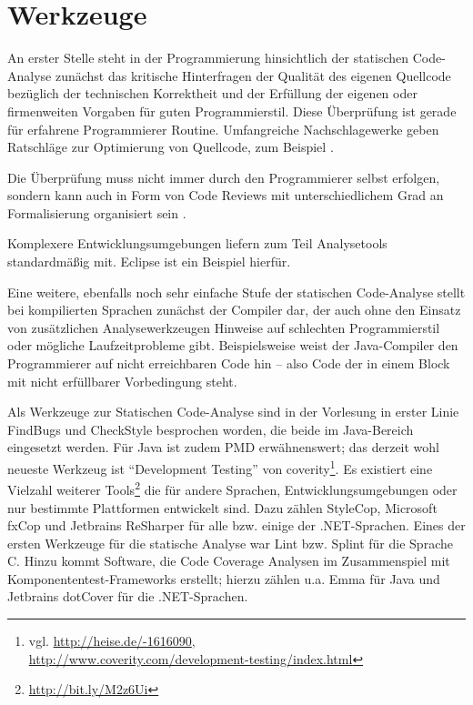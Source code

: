 \section{Werkzeuge}

An erster Stelle steht in der Programmierung hinsichtlich der statischen Code-Analyse zunächst das kritische Hinterfragen der Qualität des eigenen Quellcode bezüglich der technischen Korrektheit und der  Erfüllung der eigenen oder firmenweiten Vorgaben für guten Programmierstil. Diese Überprüfung ist gerade für erfahrene Programmierer Routine. Umfangreiche Nachschlagewerke geben Ratschläge zur Optimierung von Quellcode, zum Beispiel \cite{mcconnell2004}.

Die Überprüfung muss nicht immer durch den Programmierer selbst erfolgen, sondern kann auch in Form von Code Reviews mit unterschiedlichem Grad an Formalisierung organisiert sein \citep{spillner2011}. 

Komplexere Entwicklungsumgebungen liefern zum Teil Analysetools standardmäßig mit. Eclipse ist ein Beispiel hierfür.

Eine weitere, ebenfalls noch sehr einfache Stufe der statischen Code-Analyse stellt bei kompilierten Sprachen zunächst der Compiler dar, der auch ohne den Einsatz von zusätzlichen Analysewerkzeugen Hinweise auf schlechten Programmierstil oder mögliche Laufzeitprobleme gibt. Beispielsweise weist der Java-Compiler den Programmierer auf nicht erreichbaren Code hin -- also Code der in einem Block mit nicht erfüllbarer Vorbedingung steht.


Als Werkzeuge zur Statischen Code-Analyse sind in der Vorlesung in erster Linie FindBugs und CheckStyle besprochen worden, die beide im Java-Bereich eingesetzt werden. Für Java ist zudem PMD erwähnenswert; das derzeit wohl neueste Werkzeug ist ``Development Testing'' von coverity\footnote{vgl. \url{http://heise.de/-1616090}, \\\url{http://www.coverity.com/development-testing/index.html}}. Es existiert eine Vielzahl weiterer Tools\footnote{\url{http://bit.ly/M2z6Ui}} die für andere Sprachen, Entwicklungsumgebungen oder nur bestimmte Plattformen entwickelt sind. Dazu zählen StyleCop, Microsoft fxCop und Jetbrains ReSharper für alle bzw. einige der .NET-Sprachen. Eines der ersten Werkzeuge für die statische Analyse war Lint bzw. Splint für die Sprache C. Hinzu kommt Software, die  Code Coverage Analysen im Zusammenspiel mit Komponententest-Frameworks erstellt; hierzu zählen u.a. Emma für Java und Jetbrains dotCover für die .NET-Sprachen.

